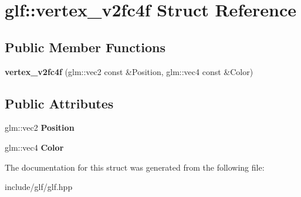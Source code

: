 \hypertarget{structglf_1_1vertex__v2fc4f}{\section{glf\-:\-:vertex\-\_\-v2fc4f Struct Reference}
\label{structglf_1_1vertex__v2fc4f}
}
\subsection*{Public Member Functions}
\begin{DoxyCompactItemize}
\item 
\hypertarget{structglf_1_1vertex__v2fc4f_afee62ba68a6dc6cdbecb0d4b6840af80}{{\bfseries vertex\-\_\-v2fc4f} (glm\-::vec2 const \&Position, glm\-::vec4 const \&Color)}\label{structglf_1_1vertex__v2fc4f_afee62ba68a6dc6cdbecb0d4b6840af80}

\end{DoxyCompactItemize}
\subsection*{Public Attributes}
\begin{DoxyCompactItemize}
\item 
\hypertarget{structglf_1_1vertex__v2fc4f_a3d26dfc8db277e732e854ab5dce53e93}{glm\-::vec2 {\bfseries Position}}\label{structglf_1_1vertex__v2fc4f_a3d26dfc8db277e732e854ab5dce53e93}

\item 
\hypertarget{structglf_1_1vertex__v2fc4f_ab91c62bb4566d721c5c72fb48bf8a789}{glm\-::vec4 {\bfseries Color}}\label{structglf_1_1vertex__v2fc4f_ab91c62bb4566d721c5c72fb48bf8a789}

\end{DoxyCompactItemize}


The documentation for this struct was generated from the following file\-:\begin{DoxyCompactItemize}
\item 
include/glf/glf.\-hpp\end{DoxyCompactItemize}
